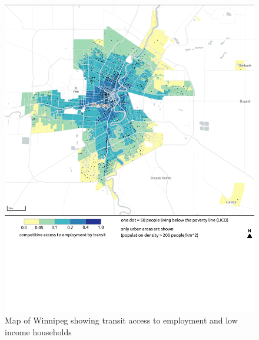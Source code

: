 \documentclass[11 pt, letterpaper]{article}
\begin{document}
{\begin{figure}[H]
	\caption{Map of Winnipeg showing transit access to employment and low income households} 
	\label{a_van}
	\centerline{\includegraphics[width=6.5in]{figures/appendix_maps/a_wpg.png}}
	\vspace{2mm}
\end{figure}

}
\end{document}
